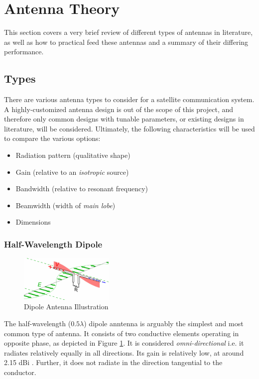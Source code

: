 \graphicspath{{./figures}}

\section{Antenna Theory}\label{sec:antenna_theory}

This section covers a very brief review of different types of antennas in literature, as well as how to practical feed these antennas and a summary of their differing performance.

\subsection{Types}\label{sec:antenna_types}
There are various antenna types to consider for a satellite communication system. A highly-customized antenna design is out of the scope of this project, and therefore only common designs with tunable parameters, or existing designs in literature, will be considered. Ultimately, the following characteristics will be used to compare the various options:
\begin{itemize}
    \item Radiation pattern (qualitative shape)
    \item Gain (relative to an \textit{isotropic} source) 
    \item Bandwidth (relative to resonant frequency)
    \item Beamwidth (width of \textit{main lobe})
    \item Dimensions
\end{itemize}

\subsubsection{Half-Wavelength Dipole}
\begin{figure}[!htb]
  \centering
  \includegraphics[width=0.4\textwidth]{dipole}
  \caption{Dipole Antenna Illustration \cite{site-designingDipole}}
  \label{fig:dipole}
\end{figure}

The half-wavelength ($0.5 \lambda$) dipole anntenna is arguably the simplest and most common type of antenna. It consists of two conductive elements operating in opposite phase, as depicted in Figure \ref{fig:dipole}. It is considered \textit{omni-directional} i.e. it radiates relatively equally in all directions. Its gain is relatively low, at around 2.15 dBi \cite{site-antennaTheory}. Further, it does not radiate in the direction tangential to the conductor.

